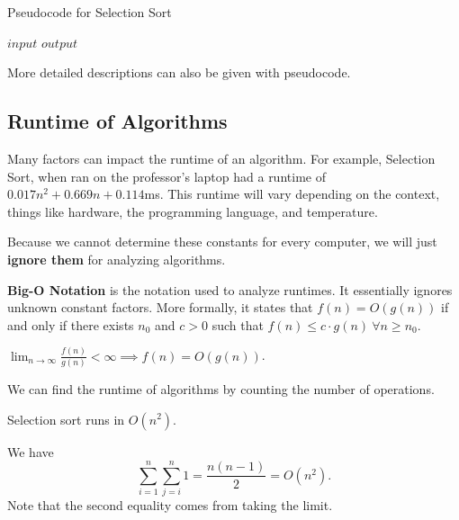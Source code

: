 \begin{algorithm}
	\algrenewcommand{}
	\algrenewcommand{}
	\caption{Pseudocode for Selection Sort}\label{alg:selection-sort}
	\begin{algorithmic}[1]
		\Require $input$
		\Ensure $output$
		\EndFor
	\end{algorithmic}
\end{algorithm}

More detailed descriptions can also be given with pseudocode.

\subsection{Runtime of Algorithms}

Many factors can impact the runtime of an algorithm. For example, Selection Sort, when ran on the professor's laptop had a runtime of \( 0.017 n^2 + 0.669 n + 0.114\)ms. This runtime will vary depending on the context, things like hardware, the programming language, and temperature.

Because we cannot determine these constants for every computer, we will just \textbf{ignore them} for analyzing algorithms.

\begin{definition}
	\textbf{Big-O Notation} is the notation used to analyze runtimes. It essentially ignores unknown constant factors. More formally, it states that \( f(n)=O(g(n)) \) if and only if there exists \( n_0 \) and \( c>0 \) such that \( f(n) \le c\cdot g(n) ~ \forall n \ge n_0\).
\end{definition}

\begin{lemma}
	\( \lim_{n \to \infty} \frac{f(n)}{g(n)} < \infty \implies f(n) = O(g(n)) \).
\end{lemma}

We can find the runtime of algorithms by counting the number of operations.

\begin{eg}
	Selection sort runs in \( O(n^2) \).
\end{eg}
\begin{explanation}
	We have \[
		\sum_{i=1}^{n} \sum_{j=i}^{n} 1 =  \frac{n(n-1)}{2} = O(n^2)
	.\] 
	Note that the second equality comes from taking the limit.
\end{explanation}

